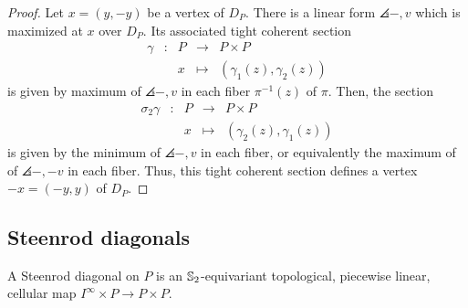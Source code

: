 \begin{proof}
	Let $x = (y,-y)$ be a vertex of $D_P$.
	There is a linear form $\angles{-,v}$ which is maximized at $x$ over $D_P$.
	Its associated tight coherent section
	\begin{equation*}
		\begin{matrix}
			\gamma & : & P & \to & P \times P \\
			& & x & \mapsto & (\gamma_1(z),\gamma_2(z))
		\end{matrix}
	\end{equation*}
	is given by maximum of $\angles{-,v}$ in each fiber $\pi^{-1}(z)$ of $\pi$.
	Then, the section
	\begin{equation*}
		\begin{matrix}
			\sigma_2\gamma & : & P & \to & P \times P \\
			& & x & \mapsto & (\gamma_2(z),\gamma_1(z))
		\end{matrix}
	\end{equation*}
	is given by the minimum of $\angles{-,v}$ in each fiber, or equivalently the maximum of of $\angles{-,-v}$ in each fiber.
	Thus, this tight coherent section defines a vertex $-x=(-y,y)$ of $D_P$.
\end{proof}


\subsection{Steenrod diagonals}

%


\begin{definition}
	A Steenrod diagonal on $P$ is an $\mathbb{S}_2$-equivariant topological, piecewise linear, cellular map $I^\infty \times P \to P \times P$.
\end{definition}

